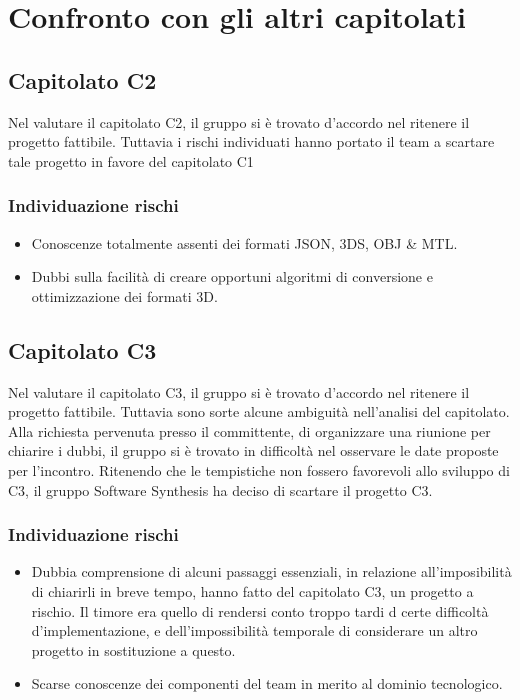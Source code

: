 \section{Confronto con gli altri capitolati}

\subsection{Capitolato C2}
Nel valutare il capitolato C2, il gruppo si è trovato d'accordo nel ritenere il progetto fattibile. Tuttavia i rischi individuati hanno portato il team a scartare tale progetto in favore del capitolato C1

\subsubsection{Individuazione rischi}
\begin{itemize}
	\item Conoscenze totalmente assenti dei formati JSON, 3DS, OBJ \& MTL.
	\item Dubbi sulla facilità di creare opportuni algoritmi di conversione e ottimizzazione dei formati 3D.
\end{itemize}

\subsection{Capitolato C3}
Nel valutare il capitolato C3, il gruppo si è trovato d'accordo nel ritenere il progetto fattibile. Tuttavia sono sorte alcune ambiguità nell'analisi del capitolato. Alla richiesta pervenuta presso il committente, di organizzare una riunione per chiarire i dubbi, il gruppo si è trovato in difficoltà nel osservare le date proposte per l'incontro. Ritenendo che le tempistiche non fossero favorevoli allo sviluppo di C3, il gruppo Software Synthesis ha deciso di scartare il progetto C3.

\subsubsection{Individuazione rischi}
\begin{itemize}
	\item Dubbia comprensione di alcuni passaggi essenziali, in relazione all'imposibilità di chiarirli in breve tempo, hanno fatto del capitolato C3, un progetto a rischio. Il timore era quello di rendersi conto troppo tardi d certe difficoltà d'implementazione, e dell'impossibilità temporale di considerare un altro progetto in sostituzione a questo.
	\item Scarse conoscenze dei componenti del team in merito al dominio tecnologico.
\end{itemize}

